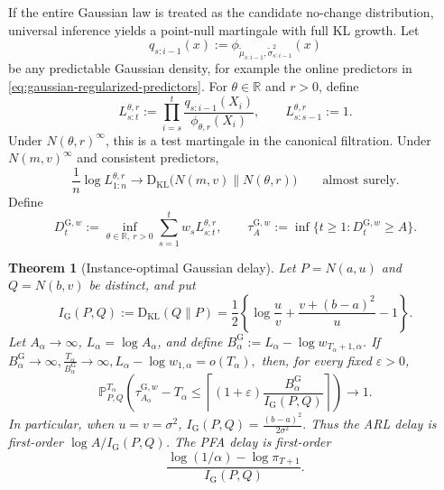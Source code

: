 \documentclass[12pt]{article}
\theoremstyle{spaced}
\newtheorem{theorem}{Theorem}[section]
\theoremstyle{remark}
\newcommand{\bbP}{\mathbb P}
\newcommand{\KL}{\mathrm{D}_{\text{KL}}}
\begin{document}
If the entire Gaussian law is treated as the candidate no-change
distribution, universal inference yields a point-null martingale with full
KL growth.  Let
\[
  q_{s:i-1}(x)
  :=\phi_{\widetilde\mu_{s:i-1},
           \widetilde\sigma^2_{s:i-1}}(x)
\]
be any predictable Gaussian density, for example the online predictors in
\eqref{eq:gaussian-regularized-predictors}.  For $\theta\in\mathbb R$ and
$r>0$, define
\begin{equation}
\label{eq:full-Gaussian-martingale}
  L_{s:t}^{\theta,r}
  :=\prod_{i=s}^t
  \frac{q_{s:i-1}(X_i)}{\phi_{\theta,r}(X_i)},
  \qquad L_{s:s-1}^{\theta,r}:=1.
\end{equation}
Under $N(\theta,r)^\infty$, this is a test martingale in the canonical
filtration.  Under $N(m,v)^\infty$ and consistent predictors,
\begin{equation}
\label{eq:full-Gaussian-growth}
  \frac1n\log L_{1:n}^{\theta,r}
  \longrightarrow
  \KL\bigl(N(m,v)\|N(\theta,r)\bigr)
  \qquad\text{almost surely}.
\end{equation}
Define
\begin{equation}
\label{eq:full-Gaussian-detector}
  D_t^{\mathrm G,w}
  :=\inf_{\theta\in\mathbb R,\ r>0}
      \sum_{s=1}^t w_sL_{s:t}^{\theta,r},
  \qquad
  \tau_A^{\mathrm G,w}
  :=\inf\{t\ge1:D_t^{\mathrm G,w}\ge A\}.
\end{equation}

\begin{theorem}[Instance-optimal Gaussian delay]
\label{thm:full-Gaussian-delay}
Let $P=N(a,u)$ and $Q=N(b,v)$ be distinct, and put
\begin{equation}
\label{eq:full-Gaussian-information}
  I_{\mathrm G}(P,Q)
  :=\KL(Q\|P)
  =\frac12\left\{
       \log\frac uv+
       \frac{v+(b-a)^2}{u}-1
     \right\}.
\end{equation}
Let $A_\alpha\to\infty$, $L_\alpha=\log A_\alpha$, and define
$B_\alpha^{\mathrm G}:=L_\alpha-
\log w_{T_\alpha+1,\alpha}$.  If
$ B_\alpha^{\mathrm G}\to\infty,
  \frac{T_\alpha}{B_\alpha^{\mathrm G}}\to\infty,
  L_\alpha-\log w_{1,\alpha}=o(T_\alpha),$
then, for every fixed $\varepsilon>0$,
\begin{equation}
\label{eq:full-Gaussian-delay-hp}
  \bbP_{P,Q}^{T_\alpha}
  \left(
    \tau_{A_\alpha}^{\mathrm G,w}-T_\alpha
    \le
    \left\lceil
      (1+\varepsilon)
      \frac{B_\alpha^{\mathrm G}}{I_{\mathrm G}(P,Q)}
    \right\rceil
  \right)
  \longrightarrow1.
\end{equation}
In particular, when $u=v=\sigma^2$,
$ I_{\mathrm G}(P,Q)=\frac{(b-a)^2}{2\sigma^2}.$
Thus the ARL delay is first-order $\log A/I_{\mathrm G}(P,Q)$.  The PFA
delay is first-order
\[
 \frac{\log(1/\alpha)-\log\pi_{T+1}}{I_{\mathrm G}(P,Q)}.
\]
\end{theorem}
\end{document}
